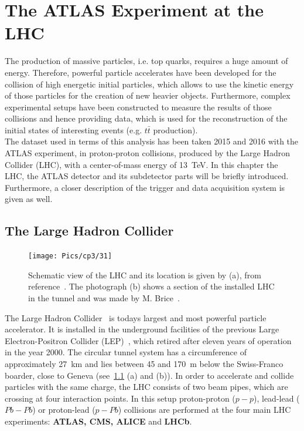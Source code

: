 \chapter{The ATLAS Experiment at the LHC}\label{ch3}

The production of massive particles, i.e. top quarks, requires a huge amount of energy. 
Therefore, powerful particle accelerates have been developed for the collision of high energetic initial particles, which allows to use the kinetic energy of those particles for the creation of new heavier objects. Furthermore, complex experimental setups have been constructed to measure the results of those collisions and hence providing data, which is used for the reconstruction of the initial states of interesting events (e.g. $t\bar{t}$ production).\\   

\noindent The dataset used in terms of this analysis has been taken 2015 and 2016 with the ATLAS experiment, in proton-proton collisions, produced by the Large Hadron Collider (LHC), with a center-of-mass energy of 13~TeV. In this chapter the LHC, the ATLAS detector and its subdetector parts will be briefly introduced. Furthermore, a closer description of the trigger and data acquisition system is given as well. 




\section{The Large Hadron Collider}\label{LHC}
\vspace{0.5cm}
\begin{figure}[h]
\centering
\texttt{[image: Pics/cp3/31]}
\caption{Schematic view of the LHC and its location is given by (a), from reference~\cite{Bruning:2012zz}. The photograph (b) shows a section of the installed LHC in the  tunnel and was made by M. Brice~\cite{Brice:2221112}. }
\label{fig:31}
\end{figure}

\noindent The Large Hadron Collider~\cite{Bruning:2012zz,Bruning:2004ej,Evans:2008zzb} is todays largest and most powerful particle accelerator. It is installed in the underground facilities of the previous Large Electron-Positron Collider (LEP)~\cite{LEP}, which retired after eleven years of operation in the year 2000. The circular tunnel system has a circumference of approximately 27~km and lies between 45 and 170~m below the Swiss-Franco boarder, close to Geneva (see~\cref{fig:31} (a) and (b)). In order to accelerate and collide particles with the same charge, the LHC consists of two beam pipes, which are crossing at four interaction points. In this setup proton-proton ($p-p$), lead-lead ($Pb-Pb$) or proton-lead ($p-Pb$) collisions are performed at the four main LHC experiments: \textbf{ATLAS, CMS, ALICE} and \textbf{LHCb}.\\ 

